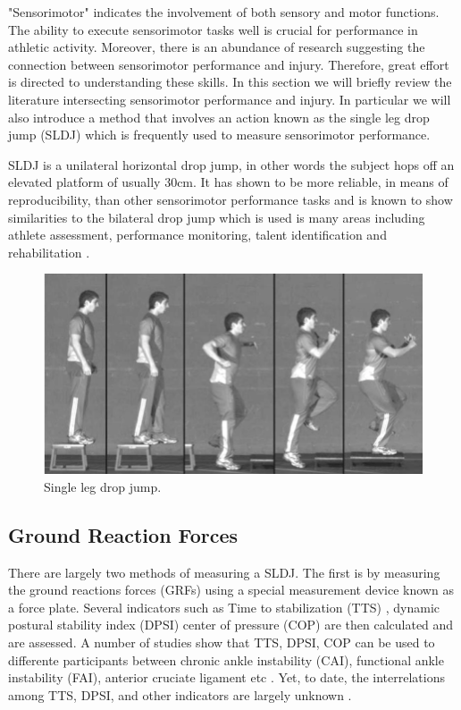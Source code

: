 
"Sensorimotor" indicates the involvement of both sensory and motor functions. The ability to execute sensorimotor tasks well is crucial for performance in athletic activity. Moreover, there is an abundance of research suggesting the connection between sensorimotor performance and injury. Therefore, great effort is directed to understanding these skills. In this section we will briefly review the literature intersecting sensorimotor performance and injury. In particular we will also introduce a method that involves an action known as the single leg drop jump (SLDJ) which is frequently used to measure sensorimotor performance. 

SLDJ is a unilateral horizontal drop jump, in other words the subject hops off an elevated platform of usually 30cm. It has shown to be more reliable, in means of reproducibility, than other sensorimotor performance tasks and is known to show similarities to the bilateral drop jump which is used is many areas including athlete assessment, performance monitoring, talent identification and rehabilitation \cite{Stalbom2007ReliabilityReport}.

\begin{figure}[hb]
	\includegraphics[width = \linewidth]{images/jump/sldj.png}
	\caption{Single leg drop jump\cite{Wild2011ABiomechanical}.}
	\label{homo}
\end{figure}


\newpage

\subsection{Ground Reaction Forces}

There are largely two methods of measuring a SLDJ. The first is by measuring the ground reactions forces (GRFs) using a special measurement device known as a force plate. Several indicators such as Time to stabilization (TTS) \cite{Fransz2014HowTask}, dynamic postural stability index (DPSI) \cite{Huurnink2019TheStudy} center of pressure (COP) \cite{Fransz2014HowTask} are then calculated and are assessed. A number of studies show that TTS, DPSI, COP can be used to differente participants between chronic ankle instability (CAI), functional ankle instability (FAI), anterior cruciate ligament etc \cite{WIKSTROM2005DetectionInstability}. Yet, to date, the interrelations among TTS, DPSI, and other indicators are largely unknown \cite{Huurnink2019TheStudy}. 

